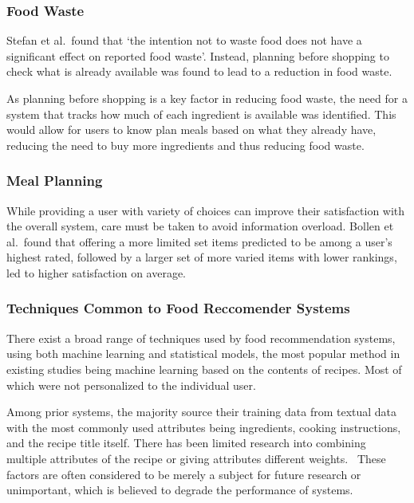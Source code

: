 \subsubsection{Food Waste}
Stefan et al.\ found that \enquote*{the intention not to waste food does not have a
significant effect on reported food waste}. Instead, planning before shopping to
check what is already available was found to lead to a reduction in food waste.~\cite{stefan_avoiding_2013}

As planning before shopping is a key factor in reducing food waste, the need for a system
that tracks how much of each ingredient is available was identified. This would allow for
users to know plan meals based on what they already have, reducing the need to buy more ingredients
and thus reducing food waste.

\subsubsection{Meal Planning}
\label{sec:overload_intro}While providing a user with variety of choices can improve their satisfaction
with the overall system, care must be taken to avoid information overload.
Bollen et al.\ found that offering a more limited set items predicted to be among a user's
highest rated, followed by a larger set of more varied items with lower rankings, led to
higher satisfaction on average.~\cite{bollen_understanding_2010}

\subsubsection{Techniques Common to Food Reccomender Systems}
There exist a broad range of techniques used by food recommendation systems, using both machine learning
and statistical models, the most popular method in existing studies being machine learning based on the
contents of recipes. Most of which were not personalized to the individual user.~\cite{bondevik_systematic_2024}

Among prior systems, the majority source their training data from textual data with the most commonly used
attributes being ingredients, cooking instructions, and the recipe title itself. There has been limited research
into combining multiple attributes of the recipe or giving attributes different weights.~\cite{chen_cross-modal_2017} These factors are often
considered to be merely a subject for future research or unimportant, which is believed to degrade the performance
of systems.~\cite{bondevik_systematic_2024}

